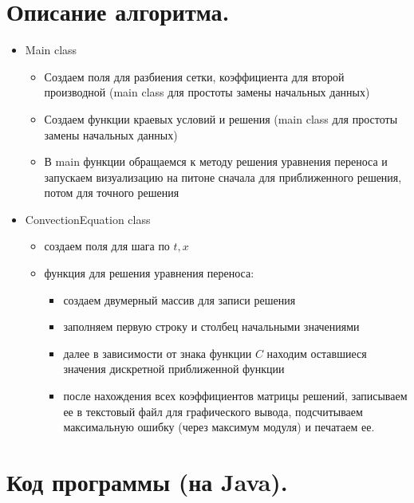 \documentclass[12pt,a4paper]{scrartcl}
\begin{document}
	\section{Описание алгоритма.}
	\begin{itemize}
		\item Main class 
		\begin{itemize}
			\item Создаем поля для разбиения сетки, коэффициента для
			второй производной (main class для простоты замены начальных
			данных)
			\item Создаем функции краевых условий и решения (main class
			для простоты замены начальных данных)
			\item В main функции обращаемся к методу решения уравнения переноса и запускаем визуализацию на питоне сначала для приближенного решения, потом для точного решения
		\end{itemize}
		\item{ConvectionEquation class}
		\begin{itemize}
			\item создаем поля для шага по $t,x$  
			\item функция для решения уравнения переноса:
			\begin{itemize}
				\item создаем двумерный массив для записи решения 
				\item заполняем первую строку и столбец начальными значениями
				\item далее в зависимости от знака функции $C$ находим оставшиеся значения дискретной приближенной функции
				\item после нахождения всех коэффициентов матрицы решений, записываем ее в текстовый файл для графического вывода, подсчитываем максимальную ошибку (через максимум модуля) и печатаем ее.
			\end{itemize}
		\end{itemize}
	\end{itemize}
	\section{Код программы (на Java).}
\end{document}
